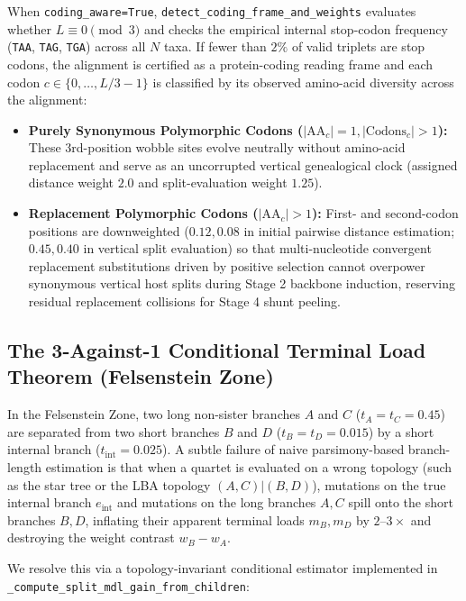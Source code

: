 \documentclass[11pt,a4paper]{article}
\begin{document}
When \texttt{coding\_aware=True}, \texttt{detect\_coding\_frame\_and\_weights} evaluates whether $L \equiv 0 \pmod 3$ and checks the empirical internal stop-codon frequency (\texttt{TAA}, \texttt{TAG}, \texttt{TGA}) across all $N$ taxa. If fewer than $2\%$ of valid triplets are stop codons, the alignment is certified as a protein-coding reading frame and each codon $c \in \{0, \dots, L/3 - 1\}$ is classified by its observed amino-acid diversity across the alignment:
\begin{itemize}[leftmargin=1.8em]
    \item \textbf{Purely Synonymous Polymorphic Codons ($|\text{AA}_c| = 1, |\text{Codons}_c| > 1$):} These 3rd-position wobble sites evolve neutrally without amino-acid replacement and serve as an uncorrupted vertical genealogical clock (assigned distance weight $2.0$ and split-evaluation weight $1.25$).
    \item \textbf{Replacement Polymorphic Codons ($|\text{AA}_c| > 1$):} First- and second-codon positions are downweighted ($0.12, 0.08$ in initial pairwise distance estimation; $0.45, 0.40$ in vertical split evaluation) so that multi-nucleotide convergent replacement substitutions driven by positive selection cannot overpower synonymous vertical host splits during Stage 2 backbone induction, reserving residual replacement collisions for Stage 4 shunt peeling.
\end{itemize}

\subsection{The 3-Against-1 Conditional Terminal Load Theorem (Felsenstein Zone)}

In the Felsenstein Zone, two long non-sister branches $A$ and $C$ ($t_A = t_C = 0.45$) are separated from two short branches $B$ and $D$ ($t_B = t_D = 0.015$) by a short internal branch ($t_{\text{int}} = 0.025$). A subtle failure of naive parsimony-based branch-length estimation is that when a quartet is evaluated on a wrong topology (such as the star tree or the LBA topology $(A,C)|(B,D)$), mutations on the true internal branch $e_{\text{int}}$ and mutations on the long branches $A, C$ spill onto the short branches $B, D$, inflating their apparent terminal loads $m_B, m_D$ by $2\text{--}3\times$ and destroying the weight contrast $w_B - w_A$.

We resolve this via a topology-invariant conditional estimator implemented in \texttt{\_compute\_split\_mdl\_gain\_from\_children}:
\end{document}
